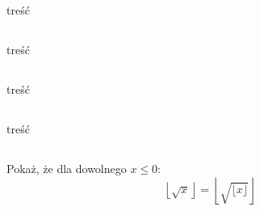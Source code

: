 \documentclass[svgnames]{article}
\begin{document}
\subsection{}%
\begin{framed}
treść
\end{framed}

\subsection{}%
\begin{framed}
treść
\end{framed}

\subsection{}%

\subsection{}%
\begin{framed}
treść
\end{framed}

\subsection{}%
\subsection{}%

\subsection{}%
\begin{framed}
treść
\end{framed}

\subsection{}%
\begin{framed}
Pokaż, że dla dowolnego $x \leq 0$:
$$ \left\lfloor \sqrt{x} \right\rfloor = \left\lfloor \sqrt{ \lfloor x \rfloor} \right\rfloor $$
\end{framed}
\end{document}
